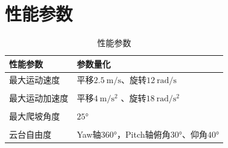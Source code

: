 \section{性能参数}

\begin{table}[hbtp!]
    \centering
    \begin{tabular}{ m{4cm}  m{7cm} }
    \toprule
      性能参数    &   参数量化  \\
     \midrule
     最大运动速度 & 平移$\qty{2.5}{\m\per\second}$、旋转$\qty{12}{\radian\per\second}$ \\ \\
     最大运动加速度  &  平移$\qty{4}{\m\per\s\squared}$  、旋转$\qty{18}{\radian\per\s\squared}$   \\ \\
   
     最大爬坡角度   &   $\ang{25}$    \\ \\
     云台自由度 & Yaw轴$\ang{360}$，Pitch轴俯角$\ang{30}$、仰角$\ang{40}$ \\ 

    \toprule
    \end{tabular}
    \caption{性能参数}
    \label{tab:tab:soldier_parameters}
\end{table}

